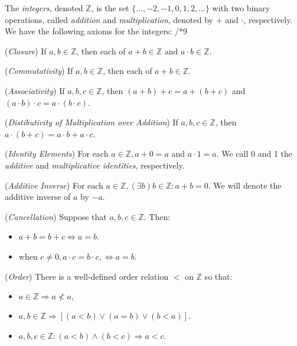 \documentclass{article}
\newcommand{\Z}{\ensuremath{\mathbb{Z}}}
\begin{document}
        The \textit{integers}, denoted $\Z$, is the set $\{\dots, -2, -1, 0, 1, 2, \dots\}$ with two binary operations, called \textit{addition} and \textit{multiplication}, denoted by $+$ and $\cdot$, respectively. We have the following axioms for the integers:
    /*9
        \begin{axiom}
            (\textit{Closure}) If $a, b \in \Z$, then each of $a + b \in \Z$ and $a\cdot b \in \Z$.
        \end{axiom}
        \begin{axiom}
            (\textit{Commutativity}) If $a, b \in \Z$, then each of $a + b \in \Z$.
        \end{axiom}
        \begin{axiom}
            (\textit{Associativity}) If $a, b, c \in \Z$, then $(a + b) + c = a + (b + c)$ and $(a\cdot b) \cdot c = a \cdot (b\cdot c)$.
        \end{axiom}
        \begin{axiom}
            (\textit{Distibutivity of Multiplication over Addition}) If $a,b,c\in \Z$, then $a\cdot (b + c) = a\cdot b + a\cdot c$.
        \end{axiom}
        \begin{axiom}
            (\textit{Identity Elements}) For each $a\in \Z, a + 0 = a$ and $a\cdot 1 = a$. We call 0 and 1 the \textit{additive} and \textit{multiplicative identities}, respectively.
        \end{axiom}
        \begin{axiom}
            (\textit{Additive Inverse}) For each $a\in \Z, (\exists b) b\in \Z \colon a + b = 0$. We will denote the additive inverse of $a$ by $-a$.
        \end{axiom}
        \begin{axiom}
            (\textit{Cancellation}) Suppose that $a,b,c\in \Z$. Then: 
            \begin{itemize}
                \item $a + b = b + c \iff a = b$.
                \item when $c \ne 0, a\cdot c = b\cdot c, \iff a = b$.
            \end{itemize}
        \end{axiom}
        \begin{axiom}
            (\textit{Order}) There is a well-defined order relation $<$ on $\Z$ so that:
            \begin{itemize}
                \item $a\in \Z \Rightarrow a \nless a,$
                \item $a, b \in \Z \Rightarrow [(a < b) \lor (a = b) \lor (b < a)]$.
                \item $a,b,c \in \Z \colon (a < b) \land (b < c) \Rightarrow a < c$.
            \end{itemize}
        \end{axiom}
\end{document}

